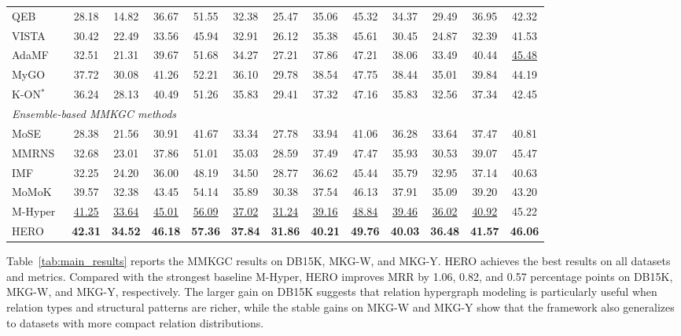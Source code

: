 \documentclass[a4paper,fleqn]{cas-sc}
\begin{document}
\begin{table}[t]
{\begin{tabular}{lcccccccccccc}
QEB~\cite{wang2023qeb}              & 28.18 & 14.82 & 36.67 & 51.55 & 32.38 & 25.47 & 35.06 & 45.32 & 34.37 & 29.49 & 36.95 & 42.32 \\
VISTA~\cite{lee2023vista}           & 30.42 & 22.49 & 33.56 & 45.94 & 32.91 & 26.12 & 35.38 & 45.61 & 30.45 & 24.87 & 32.39 & 41.53 \\
AdaMF~\cite{zhang2024adamfmat}      & 32.51 & 21.31 & 39.67 & 51.68 & 34.27 & 27.21 & 37.86 & 47.21 & 38.06 & 33.49 & 40.44 & \underline{45.48} \\
MyGO~\cite{zhang2025mygo}           & 37.72 & 30.08 & 41.26 & 52.21 & 36.10 & 29.78 & 38.54 & 47.75 & 38.44 & 35.01 & 39.84 & 44.19 \\
K-ON$^{*}$~\cite{guo2025kon}        & 36.24 & 28.13 & 40.49 & 51.26 & 35.83 & 29.41 & 37.32 & 47.16 & 35.83 & 32.56 & 37.34 & 42.45 \\
\midrule
\multicolumn{13}{l}{\textit{Ensemble-based MMKGC methods}} \\
MoSE~\cite{zhao2022mose}            & 28.38 & 21.56 & 30.91 & 41.67 & 33.34 & 27.78 & 33.94 & 41.06 & 36.28 & 33.64 & 37.47 & 40.81 \\
MMRNS~\cite{xu2022rens}             & 32.68 & 23.01 & 37.86 & 51.01 & 35.03 & 28.59 & 37.49 & 47.47 & 35.93 & 30.53 & 39.07 & 45.47 \\
IMF~\cite{li2023imf}                & 32.25 & 24.20 & 36.00 & 48.19 & 34.50 & 28.77 & 36.62 & 45.44 & 35.79 & 32.95 & 37.14 & 40.63 \\
MoMoK~\cite{zhang2025momok}         & 39.57 & 32.38 & 43.45 & 54.14 & 35.89 & 30.38 & 37.54 & 46.13 & 37.91 & 35.09 & 39.20 & 43.20 \\
M-Hyper~\cite{liu2026mhyper}        & \underline{41.25} & \underline{33.64} & \underline{45.01} & \underline{56.09}
            & \underline{37.02} & \underline{31.24} & \underline{39.16} & \underline{48.84}
            & \underline{39.46} & \underline{36.02} & \underline{40.92} & 45.22 \\
\midrule
HERO        & \textbf{42.31} & \textbf{34.52} & \textbf{46.18} & \textbf{57.36}
            & \textbf{37.84} & \textbf{31.86} & \textbf{40.21} & \textbf{49.76}
            & \textbf{40.03} & \textbf{36.48} & \textbf{41.57} & \textbf{46.06} \\
\bottomrule
\end{tabular}
}
\end{table}


Table~\ref{tab:main_results} reports the MMKGC results on DB15K, MKG-W, and MKG-Y. HERO achieves the best results on all datasets and metrics. Compared with the strongest baseline M-Hyper, HERO improves MRR by 1.06, 0.82, and 0.57 percentage points on DB15K, MKG-W, and MKG-Y, respectively. The larger gain on DB15K suggests that relation hypergraph modeling is particularly useful when relation types and structural patterns are richer, while the stable gains on MKG-W and MKG-Y show that the framework also generalizes to datasets with more compact relation distributions.
\end{document}
